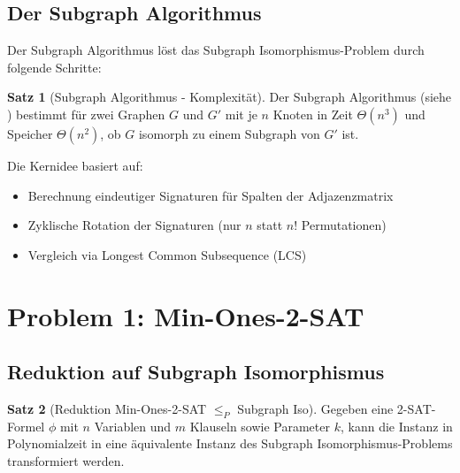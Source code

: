 ﻿\documentclass[a4paper,12pt]{article}
\theoremstyle{definition}
\newtheorem{satz}{Satz}[section]
\begin{document}
\subsection{Der Subgraph Algorithmus}

Der Subgraph Algorithmus löst das Subgraph Isomorphismus-Problem durch folgende Schritte:

\begin{satz}[Subgraph Algorithmus - Komplexität]
	Der Subgraph Algorithmus (siehe \cite{subgraph2026}) bestimmt für zwei Graphen $G$ und $G'$ mit je $n$ Knoten in Zeit $\Theta(n^3)$ und Speicher $\Theta(n^2)$, ob $G$ isomorph zu einem Subgraph von $G'$ ist.
\end{satz}

Die Kernidee basiert auf:
\begin{itemize}
	\item Berechnung eindeutiger Signaturen für Spalten der Adjazenzmatrix
	\item Zyklische Rotation der Signaturen (nur $n$ statt $n!$ Permutationen)
	\item Vergleich via Longest Common Subsequence (LCS)
\end{itemize}

\section{Problem 1: Min-Ones-2-SAT}

\subsection{Reduktion auf Subgraph Isomorphismus}

\begin{satz}[Reduktion Min-Ones-2-SAT $\leq_P$ Subgraph Iso]
	Gegeben eine 2-SAT-Formel $\phi$ mit $n$ Variablen und $m$ Klauseln sowie Parameter $k$, kann die Instanz in Polynomialzeit in eine äquivalente Instanz des Subgraph Isomorphismus-Problems transformiert werden.
\end{satz}
\end{document}
